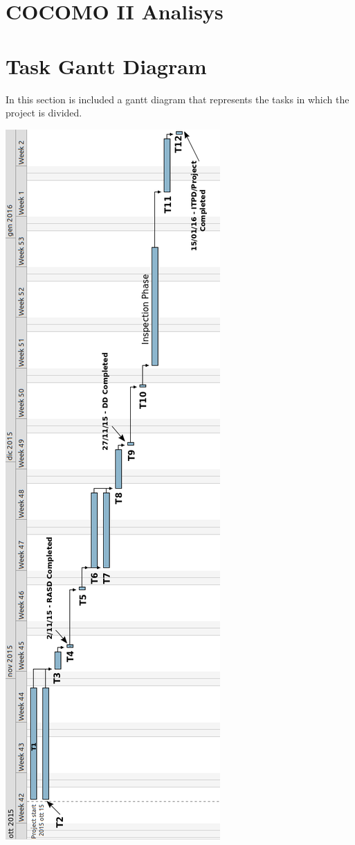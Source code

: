 \documentclass[11pt,titlepage]{article} %
\begin{document}
\section{COCOMO II Analisys}

\newpage

\section{Task Gantt Diagram}
 In this section is included a gantt diagram that represents the tasks in which the project is divided.\newline
 \begin{center}
  \includegraphics[scale=0.4]{gantt.png}
 \end{center}
\newpage
\end{document}
